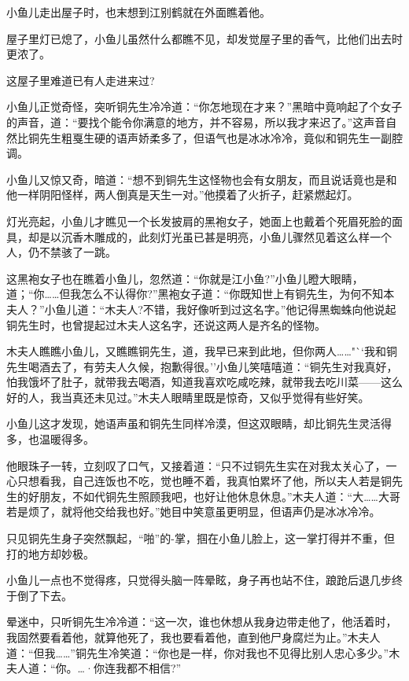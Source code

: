 \documentclass[12pt,oneside]{book}
\begin{document}
小鱼儿走出屋子时，也末想到江别鹤就在外面瞧着他。

屋子里灯已熄了，小鱼儿虽然什么都瞧不见，却发觉屋子里的香气，比他们出去时更浓了。

这屋子里难道已有人走进来过?

小鱼儿正觉奇怪，突听铜先生冷冷道：``你怎地现在才来？''黑暗中竟响起了个女子的声音，道：``要找个能令你满意的地方，并不容易，所以我才来迟了。''这声音自然比铜先生粗戛生硬的语声娇柔多了，但语气也是冰冰冷冷，竟似和铜先生一副腔调。

小鱼儿又惊又奇，暗道：``想不到铜先生这怪物也会有女朋友，而且说话竟也是和他一样阴阳怪样，两人倒真是天生一对。''他摸着了火折子，赶紧燃起灯。

灯光亮起，小鱼儿才瞧见一个长发披肩的黑袍女子，她面上也戴着个死眉死脸的面具，却是以沉香木雕成的，此刻灯光虽已甚是明亮，小鱼儿骤然见着这么样一个人，仍不禁骇了一跳。

这黑袍女子也在瞧着小鱼儿，忽然道：``你就是江小鱼?''小鱼儿瞪大眼睛，道；``你\ldots\ldots 但我怎么不认得你?''黑袍女子道：``你既知世上有铜先生，为何不知本夫人？''小鱼儿道：``木夫人?不错，我好像听到过这名字。''他记得黑蜘蛛向他说起铜先生时，也曾提起过木夫人这名字，还说这两人是齐名的怪物。

木夫人瞧瞧小鱼儿，又瞧瞧铜先生，道，我早已来到此地，但你两人\ldots\ldots"``我和铜先生喝酒去了，有劳夫人久候，抱歉得很。''小鱼儿笑嘻嘻道：``铜先生对我真好，怕我饿坏了肚子，就带我去喝酒，知道我喜欢吃咸吃辣，就带我去吃川菜------这么好的人，我当真还未见过。''木夫人眼睛里既是惊奇，又似乎觉得有些好笑。

小鱼儿这才发现，她语声虽和铜先生同样冷漠，但这双眼睛，却比铜先生灵活得多，也温暖得多。

他眼珠子一转，立刻叹了口气，又接着道：``只不过铜先生实在对我太关心了，一心只想看我，自己连饭也不吃，觉也睡不着，我真怕累坏了他，所以夫人若是铜先生的好朋友，不如代铜先生照顾我吧，也好让他休息休息。''木夫人道：``大\ldots\ldots 大哥若是烦了，就将他交给我也好。''她目中笑意虽更明显，但语声仍是冰冰冷冷。

只见铜先生身子突然飘起，``啪''的-掌，掴在小鱼儿脸上，这一掌打得并不重，但打的地方却妙极。

小鱼儿一点也不觉得疼，只觉得头脑一阵晕眩，身子再也站不住，踉跄后退几步终于倒了下去。

晕迷中，只听铜先生冷冷道：``这一次，谁也休想从我身边带走他了，他活着时，我固然要看着他，就算他死了，我也要看着他，直到他尸身腐烂为止。''木夫人道：``但我\ldots\ldots{}''铜先生冷笑道：``你也是一样，你对我也不见得比别人忠心多少。''木夫人道：``你。\ldots·你连我都不相信?''
\end{document}
